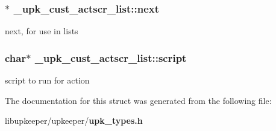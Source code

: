 \subsubsection[{next}]{$\ast$ {\bf \_\-upk\_\-cust\_\-actscr\_\-list::next}}\label{struct__upk__cust__actscr__list_a05337059f1f9aebedff4e8229a934712}
next, for use in lists 
\subsubsection[{script}]{\setlength{\rightskip}{0pt plus 5cm}char$\ast$ {\bf \_\-upk\_\-cust\_\-actscr\_\-list::script}}\label{struct__upk__cust__actscr__list_af3ca3ee67f9939bd9a696ebb2043b157}
script to run for action 

The documentation for this struct was generated from the following file:\begin{DoxyCompactItemize}
\item 
libupkeeper/upkeeper/{\bf upk\_\-types.h}\end{DoxyCompactItemize}
